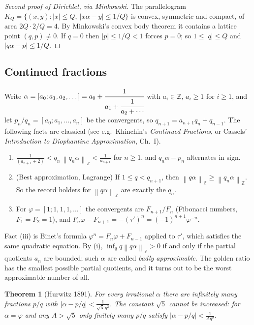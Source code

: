 \documentclass[11pt,openany]{book}
\theoremstyle{plain}
\newtheorem{theorem}{Theorem}[chapter]
\theoremstyle{definition}
\theoremstyle{remark}
\newcommand{\Z}{\mathbb{Z}}
\newcommand{\abs}[1]{\left\lvert #1 \right\rvert}
\newcommand{\norm}[1]{\left\lVert #1 \right\rVert}
\begin{document}
\begin{proof}[Second proof of Dirichlet, via Minkowski]
The parallelogram $K_Q=\{(x,y):\abs{x}\le Q,\ \abs{x\alpha-y}\le1/Q\}$ is convex, symmetric and compact,
of area $2Q\cdot 2/Q=4$. By Minkowski's convex body theorem it contains a lattice point
$(q,p)\neq0$. If $q=0$ then $\abs{p}\le1/Q<1$ forces $p=0$; so $1\le\abs{q}\le Q$ and
$\abs{q\alpha-p}\le1/Q$.
\end{proof}

\subsection*{Continued fractions}

Write $\alpha=[a_0;a_1,a_2,\dots]=a_0+\cfrac{1}{a_1+\cfrac{1}{a_2+\dotsb}}$ with $a_i\in\Z$, $a_i\ge1$
for $i\ge1$, and let $p_n/q_n=[a_0;a_1,\dots,a_n]$ be the convergents, so
$q_{n+1}=a_{n+1}q_n+q_{n-1}$. The following facts are classical (see e.g.\ Khinchin's
\emph{Continued Fractions}, or Cassels' \emph{Introduction to Diophantine Approximation}, Ch.~I).
\begin{enumerate}[nosep,label=(\roman*)]
\item $\frac{1}{(a_{n+1}+2)}<q_n\,\norm{q_n\alpha}_\Z<\frac{1}{a_{n+1}}$ for $n\ge1$, and $q_n\alpha-p_n$
  alternates in sign.
\item (Best approximation, Lagrange) If $1\le q<q_{n+1}$, then $\norm{q\alpha}_\Z\ge\norm{q_n\alpha}_\Z$.
  So the record holders for $\norm{q\alpha}_\Z$ are exactly the $q_n$.
\item For $\varphi=[1;1,1,1,\dots]$ the convergents are $F_{n+1}/F_n$ (Fibonacci numbers,
  $F_1=F_2=1$), and $F_n\varphi-F_{n+1}=-(\tau')^{n}=(-1)^{n+1}\varphi^{-n}$.
\end{enumerate}
Fact (iii) is Binet's formula $\varphi^n=F_n\varphi+F_{n-1}$ applied to $\tau'$, which satisfies the
same quadratic equation. By (i), $\inf_q q\norm{q\alpha}_\Z>0$ if and only if the partial quotients $a_n$
are bounded; such $\alpha$ are called \emph{badly approximable}. The golden ratio has the smallest
possible partial quotients, and it turns out to be the worst approximable number of all.

\begin{theorem}[Hurwitz 1891]\label{ERG:thm:hurwitz}
For every irrational $\alpha$ there are infinitely many fractions $p/q$ with
$\abs{\alpha-p/q}<\frac1{\sqrt5\,q^2}$. The constant $\sqrt5$ cannot be increased: for
$\alpha=\varphi$ and any $A>\sqrt5$ only finitely many $p/q$ satisfy $\abs{\alpha-p/q}<\frac1{Aq^2}$.
\end{theorem}
\end{document}
